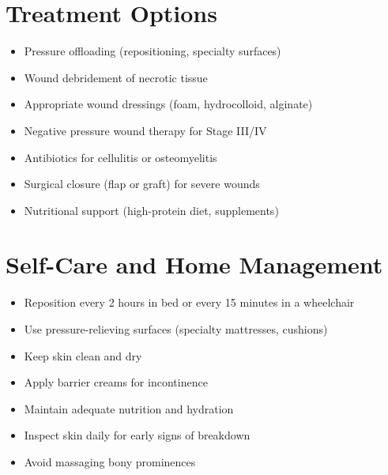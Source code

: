 \section*{Treatment Options}
\begin{itemize}
\item Pressure offloading (repositioning, specialty surfaces)
\item Wound debridement of necrotic tissue
\item Appropriate wound dressings (foam, hydrocolloid, alginate)
\item Negative pressure wound therapy for Stage III/IV
\item Antibiotics for cellulitis or osteomyelitis
\item Surgical closure (flap or graft) for severe wounds
\item Nutritional support (high-protein diet, supplements)
\end{itemize}

\section*{Self-Care and Home Management}
\begin{itemize}
\item Reposition every 2 hours in bed or every 15 minutes in a wheelchair
\item Use pressure-relieving surfaces (specialty mattresses, cushions)
\item Keep skin clean and dry
\item Apply barrier creams for incontinence
\item Maintain adequate nutrition and hydration
\item Inspect skin daily for early signs of breakdown
\item Avoid massaging bony prominences
\end{itemize}


